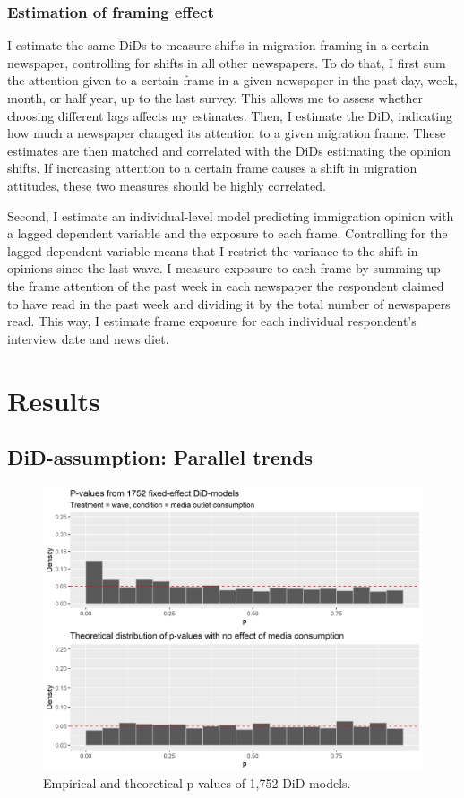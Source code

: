\documentclass{article}
\begin{document}
\subsubsection{Estimation of framing effect}\label{sec:models}

I estimate the same DiDs to measure shifts in migration framing in a certain newspaper, controlling for shifts in all other newspapers. To do that, I first sum the attention given to a certain frame in a given newspaper in the past day, week, month, or half year, up to the last survey. This allows me to assess whether choosing different lags affects my estimates. Then, I estimate the DiD, indicating how much a newspaper changed its attention to a given migration frame. These estimates are then matched and correlated with the DiDs estimating the opinion shifts. If increasing attention to a certain frame causes a shift in migration attitudes, these two measures should be highly correlated.

Second, I estimate an individual-level model predicting immigration opinion with a lagged dependent variable and the exposure to each frame. Controlling for the lagged dependent variable means that I restrict the variance to the shift in opinions since the last wave. I measure exposure to each frame by summing up the frame attention of the past week in each newspaper the respondent claimed to have read in the past week and dividing it by the total number of newspapers read. This way, I estimate frame exposure for each individual respondent's interview date and news diet.


\section{Results}

\subsection{DiD-assumption: Parallel trends}

\begin{figure}[!ht]
    \centering
    \includegraphics[width=\textwidth]{paper/vis/DiD_model_ps.png}
    \caption{Empirical and theoretical p-values of 1,752 DiD-models.}
    \label{fig:p_values}
\end{figure}
\end{document}
